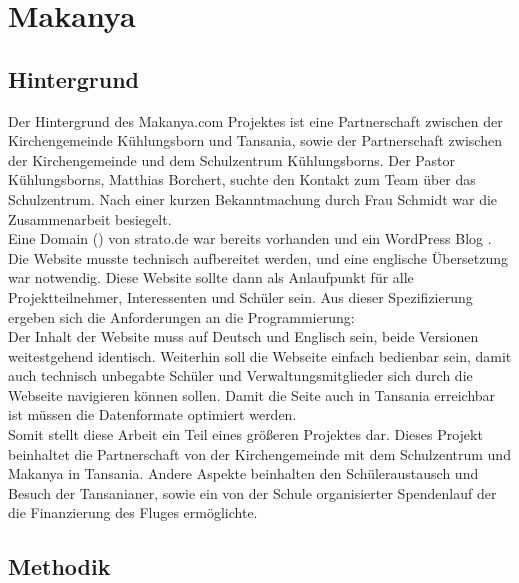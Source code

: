 \section{Makanya}

\subsection{Hintergrund} %
Der Hintergrund des Makanya.com Projektes ist eine Partnerschaft
zwischen der Kirchengemeinde Kühlungsborn und Tansania,
sowie der Partnerschaft zwischen der Kirchengemeinde und dem Schulzentrum Kühlungsborns.
Der Pastor Kühlungsborns, Matthias Borchert,
suchte den Kontakt zum \jf Team über das Schulzentrum.
Nach einer kurzen Bekanntmachung durch Frau Schmidt war die Zusammenarbeit besiegelt.\\
Eine Domain () von strato.de war bereits vorhanden%
und ein WordPress Blog .
Die Website musste technisch aufbereitet werden, und eine englische Übersetzung war notwendig.
Diese Website sollte dann als Anlaufpunkt für alle Projektteilnehmer, Interessenten und Schüler sein.
Aus dieser Spezifizierung ergeben sich die Anforderungen an die Programmierung:\\
Der Inhalt der Website muss auf Deutsch und Englisch sein, beide Versionen weitestgehend identisch.
Weiterhin soll die Webseite einfach bedienbar sein,
damit auch technisch unbegabte Schüler und Verwaltungsmitglieder sich durch die Webseite navigieren können sollen.
Damit die Seite auch in Tansania erreichbar ist müssen die Datenformate optimiert werden.\\
Somit stellt diese Arbeit ein Teil eines größeren Projektes dar.
Dieses Projekt beinhaltet die Partnerschaft von der Kirchengemeinde mit dem Schulzentrum und Makanya in Tansania.
Andere Aspekte beinhalten den Schüleraustausch und Besuch der Tansanianer,
sowie ein von der Schule organisierter Spendenlauf der die Finanzierung des Fluges ermöglichte.

\subsection{Methodik} %

